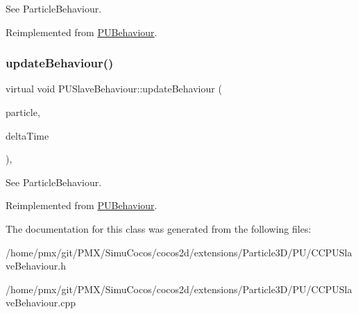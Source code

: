See Particle\+Behaviour. 

Reimplemented from \hyperlink{classPUBehaviour}{P\+U\+Behaviour}.

\mbox{\label{classPUSlaveBehaviour_abc928fb9c94c37ec534007ef2eda06fe}} 
\subsubsection{\texorpdfstring{update\+Behaviour()}{updateBehaviour()}\hspace{0.1cm}{\footnotesize\ttfamily [2/2]}}
{\footnotesize\ttfamily virtual void P\+U\+Slave\+Behaviour\+::update\+Behaviour (\begin{DoxyParamCaption}\item[{\hyperlink{structPUParticle3D}{P\+U\+Particle3D} $\ast$}]{particle,  }\item[{float}]{delta\+Time }\end{DoxyParamCaption})\hspace{0.3cm}{\ttfamily [override]}, {\ttfamily [virtual]}}

See Particle\+Behaviour. 

Reimplemented from \hyperlink{classPUBehaviour}{P\+U\+Behaviour}.



The documentation for this class was generated from the following files\+:\begin{DoxyCompactItemize}
\item 
/home/pmx/git/\+P\+M\+X/\+Simu\+Cocos/cocos2d/extensions/\+Particle3\+D/\+P\+U/C\+C\+P\+U\+Slave\+Behaviour.\+h\item 
/home/pmx/git/\+P\+M\+X/\+Simu\+Cocos/cocos2d/extensions/\+Particle3\+D/\+P\+U/C\+C\+P\+U\+Slave\+Behaviour.\+cpp\end{DoxyCompactItemize}
